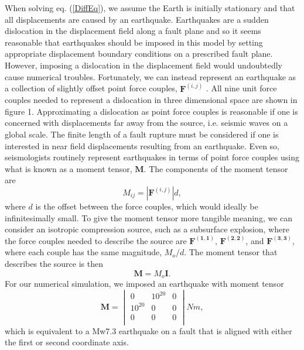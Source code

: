 \documentclass[12pt]{article}
\begin{document}
When solving eq. (\ref{DiffEq}), we assume the Earth is initially
stationary and that all displacements are caused by an earthquake.
Earthquakes are a sudden dislocation in the displacement field along a
fault plane and so it seems reasonable that earthquakes should be
imposed in this model by setting appropriate displacement boundary
conditions on a prescribed fault plane.  However, imposing a
dislocation in the displacement field would undoubtedly cause
numerical troubles.  Fortunately, we can instead represent an
earthquake as a collection of slightly offset point force couples,
$\boldsymbol{F}^{(i,j)}$ \citep{AR2002}.  All nine unit force
couples needed to represent a dislocation in three dimensional space
are shown in figure 1. Approximating a dislocation as point force
couples is reasonable if one is concerned with displacements far away
from the source, i.e. seismic waves on a global scale.  The finite
length of a fault rupture must be considered if one is interested in
near field displacements resulting from an earthquake.  Even so,
seismologists routinely represent earthquakes in terms of point force
couples using what is known as a moment tensor, $\boldsymbol{M}$.  The
components of the moment tensor are
\begin{equation}\label{MomentTensorComponents}
  M_{ij} = |\boldsymbol{F}^{(i,j)}|d,
\end{equation}
where $d$ is the offset between the force couples, which would ideally
be infinitesimally small.  To give the moment tensor more tangible
meaning, we can consider an isotropic compression source, such as a
subsurface explosion, where the force couples needed to describe the
source are $\boldsymbol{F^{(1,1)}}$, $\boldsymbol{F^{(2,2)}}$, and 
$\boldsymbol{F^{(3,3)}}$, where each couple has the same magnitude, $M_o/d$.
The moment tensor that describes the source is then
\begin{equation}
  \boldsymbol{M} = M_o\boldsymbol{I}.
\end{equation}
For our numerical simulation, we imposed an earthquake with moment
tensor
\begin{equation}
  \boldsymbol{M} = 
  \begin{vmatrix}
  0&10^{20}&0 \\
  10^{20}&0&0 \\
  0&0&0 \\
  \end{vmatrix} N m,
\end{equation}
which is equivalent to a Mw7.3 earthquake on a fault that is aligned
with either the first or second coordinate axis.  
\end{document}

